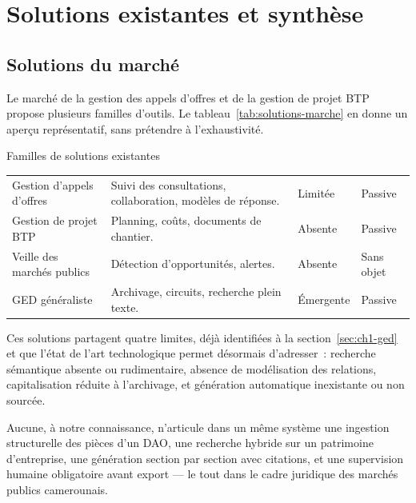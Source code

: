 \section{Solutions existantes et synthèse}
\label{sec:ch1-solutions}

\subsection{Solutions du marché}

Le marché de la gestion des appels d'offres et de la gestion de projet BTP
propose plusieurs familles d'outils. Le tableau~\ref{tab:solutions-marche}
en donne un aperçu représentatif, sans prétendre à l'exhaustivité.

\begin{btptable}{Familles de solutions existantes}
\label{tab:solutions-marche}
\begin{tabularx}{\linewidth}{@{}L{2.8cm} Y C{1.6cm} C{2.0cm}@{}}
\toprule
{}
 &  &  &  \\
\midrule
Gestion d'appels d'offres & Suivi des consultations, collaboration, modèles de réponse. & Limitée & Passive \\
Gestion de projet BTP & Planning, coûts, documents de chantier. & Absente & Passive \\
Veille des marchés publics & Détection d'opportunités, alertes. & Absente & Sans objet \\
GED généraliste & Archivage, circuits, recherche plein texte. & Émergente & Passive \\
\bottomrule
\end{tabularx}
\end{btptable}

Ces solutions partagent quatre limites, déjà identifiées à la
section~\ref{sec:ch1-ged} et que l'état de l'art technologique permet
désormais d'adresser~: recherche sémantique absente ou rudimentaire,
absence de modélisation des relations, capitalisation réduite à
l'archivage, et génération automatique inexistante ou non sourcée.

Aucune, à notre connaissance, n'articule dans un même système une ingestion
structurelle des pièces d'un DAO, une recherche hybride sur un patrimoine
d'entreprise, une génération section par section avec citations, et une
supervision humaine obligatoire avant export --- le tout dans le cadre
juridique des marchés publics camerounais.

